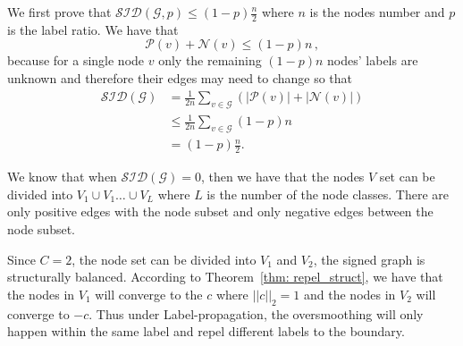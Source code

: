 We first prove that $\mathcal{SID}(\mathcal{G},p)\leq(1-p)\frac{n}{2}$ where $n$ is the nodes number and $p$ is the label ratio.
We have that 
\begin{equation}
    \mathcal{P}(v)+\mathcal{N}(v)\leq(1-p)n\, ,
\end{equation}
because for a single node $v$ only the remaining $(1-p)n$ nodes' labels are unknown and therefore their edges may need to change so that
\begin{equation}
\begin{aligned}
    \mathcal{SID}(\mathcal{G}) &= \frac{1}{2n}\sum_{v\in\mathcal{G}}(|\mathcal{P}(v)| + |\mathcal{N}(v)|)\\
    &\leq \frac{1}{2n}\sum_{v\in\mathcal{G}}(1-p)n\\
    &= (1-p)\frac{n}{2}.
\end{aligned}
\end{equation}

We know that when $\mathcal{SID}(\mathcal{G})=0$, then we have that the nodes $V$ set can be divided into $V_1\cup V_1 \dots \cup V_L$ where $L$ is the number of the node classes.
There are only positive edges with the node subset and only negative edges between the node subset.

Since $C=2$, the node set can be divided into $V_1$ and $V_2$, the signed graph is structurally balanced.
According to Theorem~\ref{thm: repel_struct}, we have that the nodes in $V_1$ will converge to the $c$ where $||c||_2=1$ and the nodes in $V_2$ will converge to $-c$.
Thus under Label-\ours propagation, the oversmoothing will only happen within the same label and repel different labels to the boundary.






